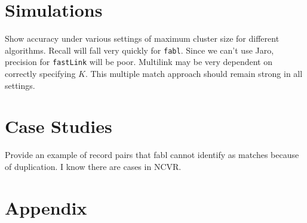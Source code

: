 \documentclass[12pt,letterpaper]{article}
\newcommand{\1}[1]{\mathbb{I}\!\left[#1\right]} %
\begin{document}
\section{Simulations}
Show accuracy under various settings of maximum cluster size for different algorithms. Recall will fall very quickly for \texttt{fabl}. Since we can't use Jaro, precision for \texttt{fastLink} will be poor.  Multilink may be very dependent on correctly specifying $K$. This multiple match approach should remain strong in all settings. 
\section{Case Studies}

 Provide an example of record pairs that fabl cannot identify as matches because of duplication. I know there are cases in NCVR.




\section{Appendix}
\label{sec:appendix}
\end{document}

